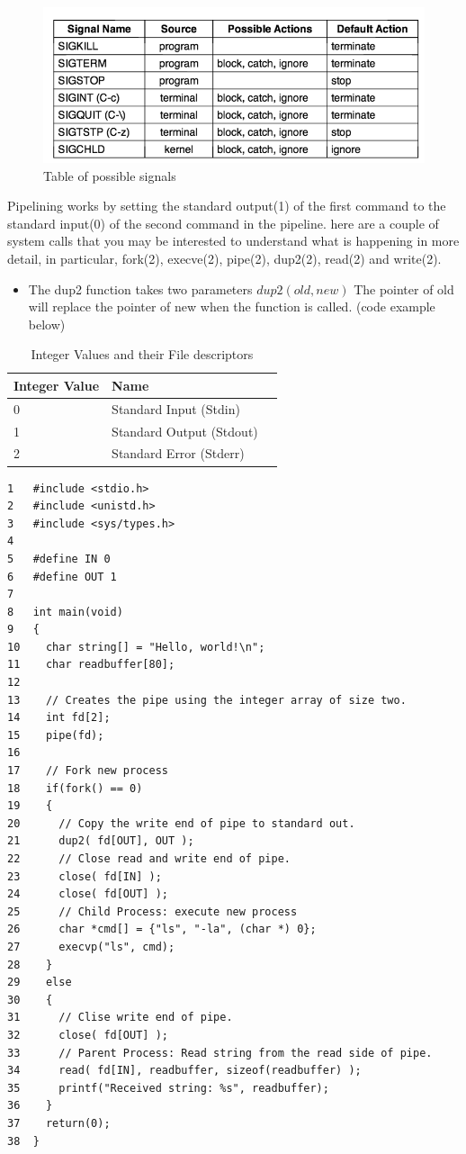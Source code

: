 \documentclass[15pt,idxtotoc,hyperref,openany]{labbook} %
\begin{document}
\begin{figure}[H] %
\begin{center}
\includegraphics[width=0.5\linewidth]{signals}
\end{center}
\caption{Table of possible signals}
\label{fig:example_figure}
\end{figure}



Pipelining works by setting the standard output(1) of the first command to the standard input(0) of the second command in the pipeline.  
here are a couple of system calls that you may be interested to understand what is happening in more detail, in particular, fork(2), 
execve(2), pipe(2), dup2(2), read(2) and write(2).

\begin{itemize}
\item The dup2 function takes two parameters $dup2(old, new)$  The pointer of old will replace the pointer of new when the function is called. (code example below)
\end{itemize}


\begin{table}[H]
\begin{tabular}{l l l}
\toprule
\textbf{Integer Value} & \textbf{Name}  \\
\toprule
0 & Standard Input (Stdin)\\
1 & Standard Output (Stdout) \\
2 & Standard Error (Stderr) \\
\bottomrule
\end{tabular}
\caption{Integer Values and their File descriptors}
\label{tab:treatments_xy}
\end{table}


 \newpage
\begin{lstlisting}
1	#include <stdio.h>
2	#include <unistd.h>
3	#include <sys/types.h>
4	
5	#define IN 0
6	#define OUT 1
7	
8	int main(void)
9	{
10	  char string[] = "Hello, world!\n";
11	  char readbuffer[80];
12	
13	  // Creates the pipe using the integer array of size two.
14	  int fd[2];
15	  pipe(fd);
16	
17	  // Fork new process
18	  if(fork() == 0)
19	  {
20	    // Copy the write end of pipe to standard out.
21	    dup2( fd[OUT], OUT );
22	    // Close read and write end of pipe.
23	    close( fd[IN] );
24	    close( fd[OUT] );
25	    // Child Process: execute new process
26	    char *cmd[] = {"ls", "-la", (char *) 0};
27	    execvp("ls", cmd);
28	  }
29	  else
30	  {
31	    // Clise write end of pipe.
32	    close( fd[OUT] );
33	    // Parent Process: Read string from the read side of pipe.
34	    read( fd[IN], readbuffer, sizeof(readbuffer) );
35	    printf("Received string: %s", readbuffer);
36	  }
37	  return(0);
38	}
\end{lstlisting}
\end{document}
